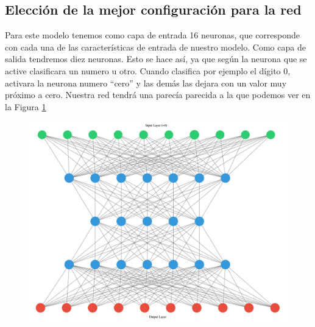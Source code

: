 \documentclass[12pt,a4paper]{article}
\begin{document}
\subsection{Elección de la mejor configuración para la red}
Para este modelo tenemos como capa de entrada 16 neuronas, que corresponde con cada una de las características de entrada de nuestro modelo. Como capa de salida tendremos diez neuronas. Esto se hace así, ya que según la neurona que se active clasificara un numero u otro. Cuando clasifica por ejemplo el dígito 0, activara la neurona numero ``cero'' y las demás las dejara con un valor muy próximo a cero. Nuestra red tendrá una parecía parecida a la que podemos ver en la Figura \ref{fig:redneuronal}
\begin{figure}[H]
	\centering
	\includegraphics[width=0.7\linewidth]{images/redNeuronal}
	\caption[Modelo de red neuronal]{}
	\label{fig:redneuronal}
\end{figure}
\end{document}
